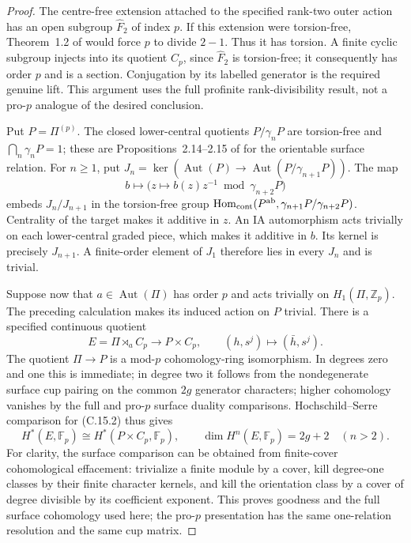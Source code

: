 \begin{proof}
The centre-free extension attached to the specified rank-two
outer action has an open subgroup $\widehat F_2$ of index
$p$.  If this extension were torsion-free, Theorem~1.2 of
\cite{CEJarden1982} would force $p$ to divide $2-1$.
Thus it has torsion.  A finite cyclic subgroup injects into
its quotient $C_p$, since $\widehat F_2$ is torsion-free;
it consequently has order $p$ and is a section.  Conjugation
by its labelled generator is the required genuine lift.
This argument uses the full profinite rank-divisibility
result, not a pro-$p$ analogue of the desired conclusion.

Put $P=\Pi^{(p)}$.  The closed lower-central quotients
$P/\gamma_nP$ are torsion-free and $\bigcap_n\gamma_nP=1$;
these are Propositions~2.14--2.15 of
\cite{CEMorales2024} for the orientable surface relation.
For $n\geq1$, put
$J_n=\ker(\operatorname{Aut}(P)\to
\operatorname{Aut}(P/\gamma_{n+1}P))$.  The map
\[
 b\longmapsto\bigl(z\longmapsto b(z)z^{-1}
                         \bmod\gamma_{n+2}P\bigr)
\]
embeds $J_n/J_{n+1}$ in the torsion-free group
$\operatorname{Hom}_{\rm cont}(P^{\rm ab},
\gamma_{n+1}P/\gamma_{n+2}P)$.  Centrality of the target
makes it additive in $z$.  An IA automorphism acts trivially
on each lower-central graded piece, which makes it additive
in $b$.  Its kernel is precisely $J_{n+1}$.
A finite-order element of $J_1$ therefore lies in every
$J_n$ and is trivial.

Suppose now that $a\in\operatorname{Aut}(\Pi)$ has order
$p$ and acts trivially on $H_1(\Pi,\mathbb Z_p)$.
The preceding calculation makes its induced action on $P$
trivial.  There is a specified continuous quotient
\[
 E=\Pi\rtimes_a C_p\longrightarrow P\times C_p,
                     \qquad(h,s^j)\longmapsto(\bar h,s^j).
                                                               \tag{C.15.2}
\]
The quotient $\Pi\to P$ is a mod-$p$ cohomology-ring
isomorphism.  In degrees zero and one this is immediate;
in degree two it follows from the nondegenerate surface
cup pairing on the common $2g$ generator characters;
higher cohomology vanishes by the full and pro-$p$
surface duality comparisons.  Hochschild--Serre comparison
for (C.15.2) thus gives
\[
 H^*(E,\mathbb F_p)\cong H^*(P\times C_p,\mathbb F_p),
 \qquad \dim H^n(E,\mathbb F_p)=2g+2\quad(n>2).
                                                               \tag{C.15.3}
\]
For clarity, the surface comparison can be obtained from
finite-cover cohomological effacement: trivialize a finite
module by a cover, kill degree-one classes by their finite
character kernels, and kill the orientation class by a
cover of degree divisible by its coefficient exponent.
This proves goodness and the full surface cohomology used
here; the pro-$p$ presentation has the same one-relation
resolution and the same cup matrix.


\end{proof}
